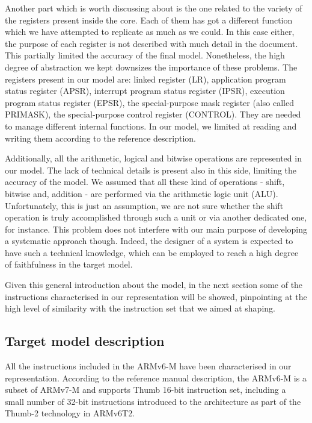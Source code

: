 \documentclass[conference]{IEEEtran}
\begin{document}
Another part which is worth discussing about is the one related to the variety of the
registers present inside the core. Each of them has got a different function which we have
attempted to replicate as much as we could. In this case either, the purpose of each register
is not described with much detail in the document. This partially limited the accuracy of the
final model. Nonetheless, the high degree of abstraction we kept downsizes the importance of
these problems. The registers present in our model are: linked register (LR), application
program status register (APSR), interrupt program status register (IPSR), execution program
status register (EPSR), the special-purpose mask register (also called PRIMASK), the special-purpose control register (CONTROL). They are needed to manage different internal functions.
In our model, we limited at reading and writing them according to the reference description.

Additionally, all the arithmetic, logical and bitwise operations are represented in our
model. The lack of technical details is present also in this side, limiting the accuracy of
the model. We assumed that all these kind of operations - shift, bitwise and, addition - are
performed via the arithmetic logic unit (ALU). Unfortunately, this is just an
assumption, we are not sure whether the shift operation is truly accomplished
through such a unit  or via another dedicated one, for instance.
This problem does not interfere with our main purpose of
developing a systematic approach though. Indeed, the designer of a system is expected to have
such a technical knowledge, which can be employed to reach a high degree of faithfulness in
the target model.

Given this general introduction about the model, in the next section some of the instructions
characterised in our representation will be showed, pinpointing at the high level of
similarity with the instruction set that we aimed at shaping.

\subsection{Target model description}
All the instructions included in the ARMv6-M have been characterised in our representation.
According to the reference manual description, the ARMv6-M is a subset of ARMv7-M and
supports Thumb 16-bit instruction set, including a small number of 32-bit instructions
introduced to the architecture as part of the Thumb-2 technology in ARMv6T2. 
\end{document}
